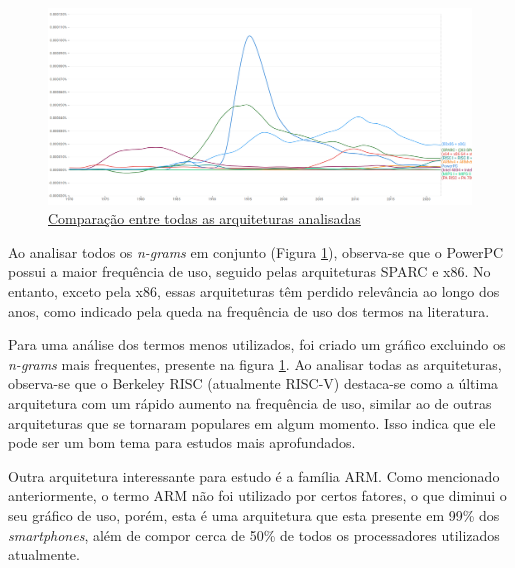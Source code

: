 \documentclass[
	article,			%
	11pt,				%
	oneside,			%
	a4paper,			%
	english,			%
	brazil,				%
	sumario=tradicional
	]{abntex2}
\begin{document}
\begin{figure}[h]
    \centering
    \includegraphics[width=1\linewidth]{Ngrams/full.png}
    \caption{\href{https://books.google.com/ngrams/graph?content=PowerPC,PA+RISC\%2BPA+7000\%2BPA+7100\%2BPA+7200\%2BPA+8000\%2BPA+8500,SPARC-((X3+SPARC+\%2B+ANSI+SPARC+\%2B+SPARC+DBMS+\%2B+SPARC+system+*+3)*10),ARMv4\%2BARMv5\%2BARMv6\%2BARMv7\%2BARMv8,MIPS+I\%2BMIPS+II\%2BMIPS+III\%2BMIPS+IV\%2BMIPS+V\%2BMIPS32\%2BMIPS64,Intel+4004\%2BIntel+4040\%2BIntel+8008\%2BIntel+8080\%2BIntel+8085\%2BIntel+8086,80x86\%2Bx86,(x64\%2Bx86+64+\%2B+x86_64),RISC+I\%2BRISC+II\%2BSPUR+Lisp\%2BSPUR+processor\%2BSPUR+project\%2Bthe+SPUR+system\%2BBerkeley+SPUR\%2BBerkeley+RISC\%2BSmalltalk+on+a+RISC\%2BBerkeley+Smalltalk\%2BSOAR+architecture\%2B[RISC-V]\%2BRISC+V&year_start=1970&year_end=2022&corpus=en&smoothing=1&case_insensitive=false}{Comparação entre todas as arquiteturas analisadas}}
    \label{fig:NgramFull}
\end{figure}

Ao analisar todos os \textit{n-grams} em conjunto (Figura \ref{fig:NgramFull}), observa-se que o PowerPC possui a maior frequência de uso, seguido pelas arquiteturas SPARC e x86. No entanto, exceto pela x86, essas arquiteturas têm perdido relevância ao longo dos anos, como indicado pela queda na frequência de uso dos termos na literatura. 

Para uma análise dos termos menos utilizados, foi criado um gráfico excluindo os \textit{n-grams} mais frequentes, presente na figura \ref{fig:NgramFull}. Ao analisar todas as arquiteturas, observa-se que o Berkeley RISC (atualmente RISC-V) destaca-se como a última arquitetura com um rápido aumento na frequência de uso, similar ao de outras arquiteturas que se tornaram populares em algum momento. Isso indica que ele pode ser um bom tema para estudos mais aprofundados.

Outra arquitetura interessante para estudo é a família ARM. Como mencionado anteriormente, o termo ARM não foi utilizado por certos fatores, o que diminui o seu gráfico de uso, porém, esta é uma arquitetura que esta presente em 99\% dos \textit{smartphones}, além de compor cerca de 50\% de todos os processadores utilizados atualmente\cite{arm_building_nodate}.
\end{document}
